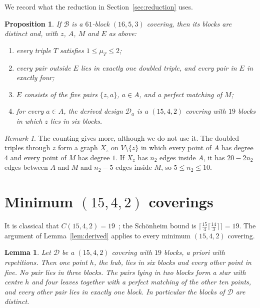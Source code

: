 \documentclass[11pt]{amsart}
\newtheorem{lemma}[theorem]{Lemma}
\newtheorem{proposition}[theorem]{Proposition}
\theoremstyle{definition}
\theoremstyle{remark}
\newtheorem{remark}[theorem]{Remark}
\newcommand{\cB}{\mathcal{B}}
\newcommand{\cD}{\mathcal{D}}
\begin{document}
We record what the reduction in Section~\ref{sec:reduction} uses.

\begin{proposition}\label{prop:necessary}
If $\cB$ is a $61$-block $(16,5,3)$ covering, then its blocks are distinct
and, with $z$, $A$, $M$ and $E$ as above:
\begin{enumerate}
\item[(N1)] every triple $T$ satisfies $1\le\mu_T\le 2$;
\item[(N2)] every pair outside $E$ lies in exactly one doubled triple, and
every pair in $E$ in exactly four;
\item[(N3)] $E$ consists of the five pairs $\{z,a\}$, $a\in A$, and a perfect
matching of $M$;
\item[(N4)] for every $a\in A$, the derived design $\cD_a$ is a $(15,4,2)$
covering with $19$ blocks in which $z$ lies in six blocks.
\end{enumerate}
\end{proposition}

\begin{remark}\label{rem:xz}
The counting gives more, although we do not use it. The doubled triples
through $z$ form a graph $X_z$ on $V\setminus\{z\}$ in which every point of
$A$ has degree $4$ and every point of $M$ has degree $1$. If $X_z$ has $n_2$
edges inside $A$, it has $20-2n_2$ edges between $A$ and $M$ and $n_2-5$ edges
inside $M$, so $5\le n_2\le 10$.
\end{remark}

\section{Minimum \texorpdfstring{$(15,4,2)$}{(15,4,2)} coverings}\label{sec:link}

It is classical that $C(15,4,2)=19$~\cite{mills1972,mills1973}; the
Sch\"onheim bound is $\lceil \tfrac{15}{4}\lceil\tfrac{14}{3}\rceil\rceil=19$.
The argument of Lemma~\ref{lem:derived} applies to every minimum
$(15,4,2)$ covering.

\begin{lemma}\label{lem:link-structure}
Let $\cD$ be a $(15,4,2)$ covering with $19$ blocks, a priori with
repetitions. Then one point $h$, the \emph{hub}, lies in six blocks and every
other point in five. No pair lies in three blocks. The pairs lying in two
blocks form a star with centre $h$ and four leaves together with a perfect
matching of the other ten points, and every other pair lies in exactly one
block. In particular the blocks of $\cD$ are distinct.
\end{lemma}
\end{document}
